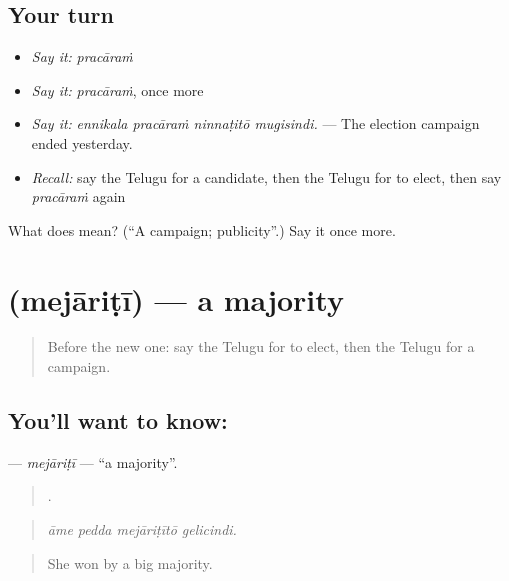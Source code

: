 \subsection*{Your turn}
\begin{itemize}
\raggedright
  \item \emph{Say it:} \emph{pracāraṁ}
  \item \emph{Say it:} \emph{pracāraṁ}, once more
  \item \emph{Say it:} \emph{ennikala pracāraṁ ninnaṭitō mugisindi.} — The election campaign ended yesterday.
  \item \emph{Recall:} say the Telugu for a candidate, then the Telugu for to elect, then say \emph{pracāraṁ} again
\end{itemize}

\begin{tcolorbox}[breakable,colback=teal!4,colframe=teal!35!black,title={Before you move on}]
What does  mean? (\textquotedblleft{}A campaign; publicity\textquotedblright{}.) Say it once more.
\end{tcolorbox}
\section[\texorpdfstring{\te{మెజారిటీ} (mejāriṭī)}{మెజారిటీ (mejāriṭī)}]{ (mejāriṭī) — a majority}

\label{lesson:TE-C400-mejariti}



\begin{quote}
Before the new one: say the Telugu for to elect, then the Telugu for a campaign.
\end{quote}

\subsection*{You'll want to know: }
\textbf{} — \emph{mejāriṭī} — \textquotedblleft{}a majority\textquotedblright{}.

\begin{quote}
   .
\end{quote}

\begin{quote}
\emph{āme pedda mejāriṭītō gelicindi.}
\end{quote}

\begin{quote}
She won by a big majority.
\end{quote}


